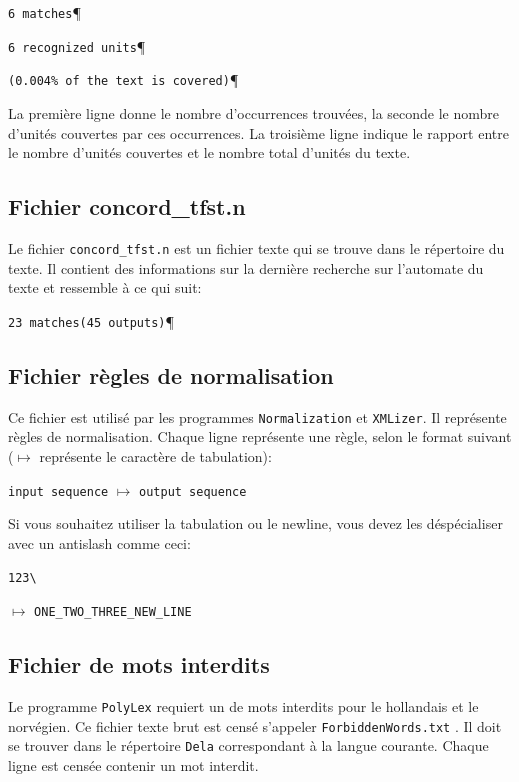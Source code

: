 \bigskip
\verb$6 matches$\P

\verb$6 recognized units$\P

\verb$(0.004% of the text is covered)$\P

\bigskip
\noindent La première ligne donne le nombre d’occurrences trouvées, la seconde le nombre d’unités
couvertes par ces occurrences. La troisième ligne indique le rapport entre le nombre d’unités
couvertes et le nombre total d’unités du texte.


\subsection{Fichier concord\_tfst.n}
Le fichier \verb+concord_tfst.n+ est un fichier texte qui se trouve dans le répertoire du texte. Il
contient des informations sur la dernière recherche sur l'automate du texte et ressemble à ce qui
suit:

\bigskip
\verb$23 matches(45 outputs)$\P



\subsection{Fichier règles de normalisation}
\label{section-normalization-file}
Ce fichier est utilisé par les programmes \verb+Normalization+ et \verb+XMLizer+. Il représente
règles de normalisation. Chaque ligne représente une règle, selon le format suivant ($\longmapsto$
	représente le caractère de tabulation):

\bigskip
\noindent \verb+input sequence+ $\longmapsto$ \verb+output sequence+

\bigskip
\noindent Si vous souhaitez utiliser la tabulation ou le newline, vous devez les déspécialiser
avec un antislash comme ceci:

\bigskip
\noindent
\verb+123\+

\noindent
$\longmapsto$ \verb+ONE_TWO_THREE_NEW_LINE+



\subsection{Fichier de mots interdits}
 \label{section-forbidden-words}
Le programme \verb+PolyLex+ requiert un de mots interdits pour le hollandais et le norvégien. Ce fichier texte brut est censé s'appeler \verb+ForbiddenWords.txt+
. Il doit se trouver dans le répertoire \verb+Dela+
correspondant à la langue courante. Chaque ligne est censée contenir un mot interdit.




